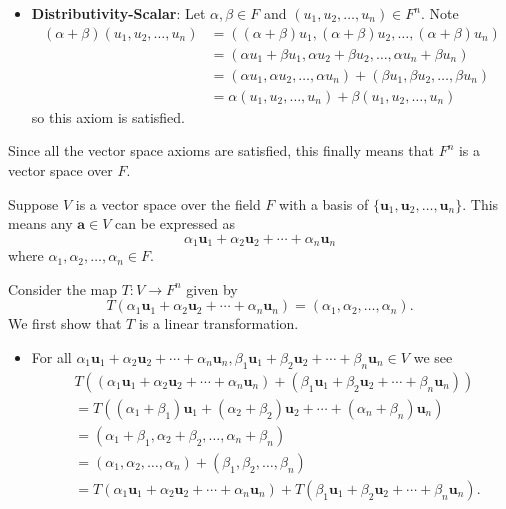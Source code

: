 \begin{questions}
\begin{itemize}
        \item \textbf{Distributivity-Scalar}: Let $\alpha, \beta \in F$ and $(u_1, u_2, \dots, u_n) \in F^n$. Note
        \begin{align*}
            (\alpha+\beta)(u_1, u_2, \dots, u_n) &= ((\alpha+\beta)u_1, (\alpha+\beta)u_2, \dots, (\alpha+\beta)u_n)\\
            &= (\alpha u_1 + \beta u_1, \alpha u_2 + \beta u_2, \dots, \alpha u_n + \beta u_n)\\
            &= (\alpha u_1, \alpha u_2, \dots, \alpha u_n) + (\beta u_1, \beta u_2, \dots, \beta u_n)\\
            &= \alpha(u_1, u_2, \dots, u_n) + \beta(u_1, u_2, \dots, u_n)
        \end{align*}
        so this axiom is satisfied.
    \end{itemize}
    Since all the vector space axioms are satisfied, this finally means that $F^n$ is a vector space over $F$.

    \item Suppose $V$ is a vector space over the field $F$ with a basis of $\{\mathbf{u}_1, \mathbf{u}_2, \dots, \mathbf{u}_n\}$. This means any $\mathbf{a} \in V$ can be expressed as
    \[
        \alpha_1\mathbf{u}_1 + \alpha_2\mathbf{u}_2 + \cdots + \alpha_n\mathbf{u}_n
    \]
    where $\alpha_1,\alpha_2,\dots,\alpha_n \in F$.

    Consider the map $T: V \to F^n$ given by
    \[
        T( \alpha_1\mathbf{u}_1 + \alpha_2\mathbf{u}_2 + \cdots + \alpha_n\mathbf{u}_n) = (\alpha_1, \alpha_2, \dots, \alpha_n).
    \]
    We first show that $T$ is a linear transformation.
    \begin{itemize}
        \item For all $\alpha_1\mathbf{u}_1 + \alpha_2\mathbf{u}_2 + \cdots + \alpha_n\mathbf{u}_n, \beta_1\mathbf{u}_1 + \beta_2\mathbf{u}_2 + \cdots + \beta_n\mathbf{u}_n \in V$ we see
        \begin{align*}
            &T((\alpha_1\mathbf{u}_1 + \alpha_2\mathbf{u}_2 + \cdots + \alpha_n\mathbf{u}_n) + (\beta_1\mathbf{u}_1 + \beta_2\mathbf{u}_2 + \cdots + \beta_n\mathbf{u}_n))\\
            &= T((\alpha_1 + \beta_1)\mathbf{u}_1 + (\alpha_2 + \beta_2)\mathbf{u}_2 + \cdots + (\alpha_n + \beta_n)\mathbf{u}_n)\\
            &= (\alpha_1 + \beta_1, \alpha_2 + \beta_2, \dots, \alpha_n + \beta_n)\\
            &= (\alpha_1, \alpha_2, \dots, \alpha_n) + (\beta_1, \beta_2, \dots, \beta_n)\\
            &= T(\alpha_1\mathbf{u}_1 + \alpha_2\mathbf{u}_2 + \cdots + \alpha_n\mathbf{u}_n) + T(\beta_1\mathbf{u}_1 + \beta_2\mathbf{u}_2 + \cdots + \beta_n\mathbf{u}_n).
        \end{align*}


\end{itemize}
\end{questions}
